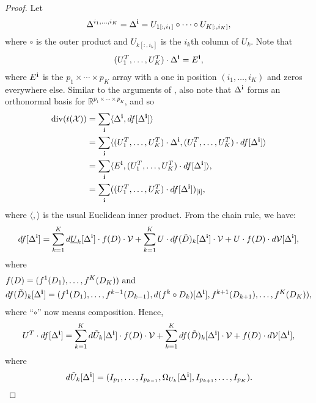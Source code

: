 \begin{proof}
  Let
  \begin{align*}
    \Delta^{i_1,\ldots,i_K} = \Delta^{\bf i} = U_{1[:,i_1]} \circ \cdots \circ U_{K[:,i_K]},
  \end{align*}
  where $\circ$ is the outer product and $U_{k[:,i_k]}$ is the $i_k$th
  column of $U_k$. Note that
  \begin{align*}
    (U_1^T,\ldots,U_K^T)\cdot\Delta^{\bf i} = E^{\bf i},
  \end{align*}
  where $E^{\bf i}$ is the $p_1\times\cdots\times p_K$ array with a
  one in position $(i_1,\ldots,i_K)$ and zeros everywhere
  else. Similar to the arguments of \cite{candes2013unbiased}, also
  note that $\Delta^{\bf i}$ forms an orthonormal basis for
  $\mathbb{R}^{p_1\times\cdots\times p_K}$, and so
  \begin{align}
    \operatorname*{div}(t(\mathcal{X})) &= \sum_{\bf i} \langle\Delta^{\bf i}, df[\Delta^{\bf i}]\rangle \nonumber\\
    &= \sum_{\bf i} \langle(U_1^T,\ldots,U_K^T)\cdot\Delta^{\bf i}, (U_1^T,\ldots,U_K^T)\cdot df[\Delta^{\bf i}]\rangle\nonumber\\
    &= \sum_{\bf i} \langle E^{\bf i}, (U_1^T,\ldots,U_K^T)\cdot df[\Delta^{\bf i}]\rangle,\nonumber\\
    \label{equation:divergence.index}
    &= \sum_{\bf i} ((U_1^T,\ldots,U_K^T)\cdot df[\Delta^{\bf i}])_{[\mathbf{i}]},
  \end{align}
  where $\langle , \rangle$ is the usual Euclidean inner product. From
  the chain rule, we have:
  \begin{align*}
    df[\Delta^{\bf i}] = \sum_{k=1}^Kd\underline{U}_k[\Delta^{\bf i}] \cdot f(D) \cdot \mathcal{V} + \sum_{k=1}^K U \cdot df(\tilde{D})_k[\Delta^{\bf i}] \cdot \mathcal{V} + U \cdot f(D) \cdot d\mathcal{V}[\Delta^{\bf i}],
  \end{align*}
  where
  \begin{align*}
    &f(D) = (f^1(D_1),\ldots,f^K(D_K)) \text{ and}\\
    &df(\tilde{D})_k[\Delta^{\bf i}] = (f^1(D_1),\ldots,f^{k-1}(D_{k-1}),d(f^k \circ D_k)[\Delta^{\bf i}],f^{k+1}(D_{k+1}),\ldots,f^K(D_K)),
  \end{align*}
  where ``$\circ$'' now means composition. Hence,
  \begin{align}
    \label{equation:u.times.df}
    U^T \cdot df[\Delta^{\bf i}] = \sum_{k=1}^Kd\tilde{U}_k[\Delta^{\bf i}] \cdot f(D) \cdot \mathcal{V} + \sum_{k=1}^K df(\tilde{D})_k[\Delta^{\bf i}] \cdot \mathcal{V} + f(D) \cdot d\mathcal{V}[\Delta^{\bf i}],
  \end{align}
  where
  \begin{align}
    d\tilde{U}_k[\Delta^{\bf i}] = (I_{p_1},\ldots,I_{p_{k-1}},\Omega_{U_k}[\Delta^{\bf i}],I_{p_{k+1}},\ldots,I_{p_K}). \label{equation:U.tilde}
  \end{align}


\end{proof}
